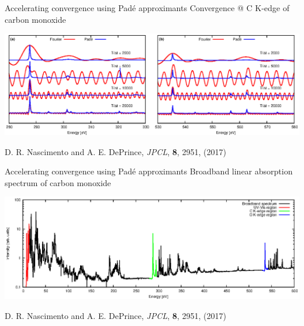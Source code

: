 \documentclass{beamer}
\begin{document}
\begin{frame}{Accelerating convergence using Pad{\'e} approximants}
Convergence @ C K-edge of carbon monoxide
\begin{center}
 \includegraphics[scale=1.0,trim={0 0 3.33in 0},clip]{figures/convergence.eps}\\
\end{center}
\footnotesize{D. R. Nascimento and A. E. DePrince, {\it JPCL}, {\bf 8}, 2951, (2017)} 
\end{frame}

\begin{frame}{Accelerating convergence using Pad{\'e} approximants}
Broadband linear absorption spectrum of carbon monoxide
\begin{center}
 \includegraphics[scale=0.65]{figures/broad.eps}\\
\end{center}
\footnotesize{D. R. Nascimento and A. E. DePrince, {\it JPCL}, {\bf 8}, 2951, (2017)} 
\end{frame}
\end{document}
